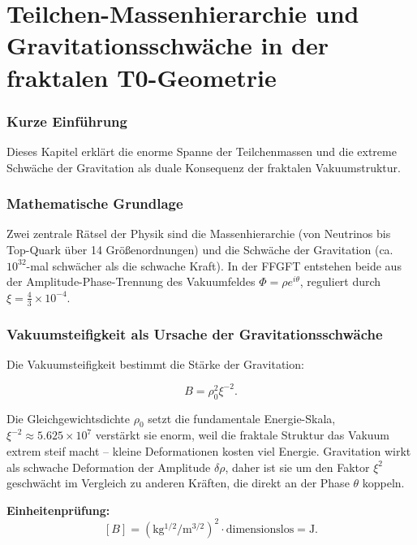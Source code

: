 \chapter{Teilchen-Massenhierarchie und Gravitationsschwäche in der fraktalen T0-Geometrie}


	
	\subsection*{Kurze Einführung}
	
	Dieses Kapitel erklärt die enorme Spanne der Teilchenmassen und die extreme Schwäche der Gravitation als duale Konsequenz der fraktalen Vakuumstruktur.
	
	\subsection*{Mathematische Grundlage}
	
	Zwei zentrale Rätsel der Physik sind die Massenhierarchie (von Neutrinos bis Top-Quark über 14 Größenordnungen) und die Schwäche der Gravitation (ca. \(10^{32}\)-mal schwächer als die schwache Kraft). In der FFGFT entstehen beide aus der Amplitude-Phase-Trennung des Vakuumfeldes \(\Phi = \rho e^{i\theta}\), reguliert durch \(\xi = \frac{4}{3} \times 10^{-4}\).

	
	\subsection*{Vakuumsteifigkeit als Ursache der Gravitationsschwäche}
	
	Die Vakuumsteifigkeit bestimmt die Stärke der Gravitation:
	
	\begin{equation}
		B = \rho_0^2 \xi^{-2}.
	\end{equation}
	
	Die Gleichgewichtsdichte \(\rho_0\) setzt die fundamentale Energie-Skala, \(\xi^{-2} \approx 5.625 \times 10^7\) verstärkt sie enorm, weil die fraktale Struktur das Vakuum extrem steif macht – kleine Deformationen kosten viel Energie. Gravitation wirkt als schwache Deformation der Amplitude \(\delta \rho\), daher ist sie um den Faktor \(\xi^2\) geschwächt im Vergleich zu anderen Kräften, die direkt an der Phase \(\theta\) koppeln.
	
	\textbf{Einheitenprüfung:}
	\[
	[B] = (\si{\kilo\gram^{1/2}\per\meter^{3/2}})^2 \cdot \text{dimensionslos} = \si{\joule}.
	\]
	

